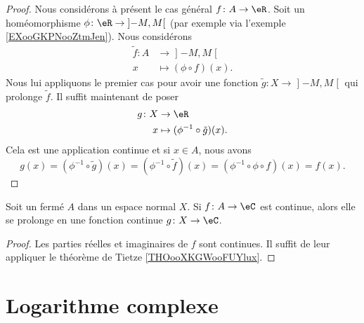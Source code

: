 \begin{proof}
    Nous considérons à présent le cas général \( f\colon A\to \eR\). Soit un homéomorphisme \( \phi\colon \eR\to \mathopen] -M , M \mathclose[\) (par exemple via l'exemple \ref{EXooGKPNooZtmJen}). Nous considérons
    \begin{equation}
        \begin{aligned}
        \tilde f\colon A&\to \mathopen] -M , M \mathclose[ \\
            x&\mapsto (\phi\circ f)(x). 
        \end{aligned}
    \end{equation}
    Nous lui appliquons le premier cas pour avoir une fonction \( \tilde g\colon X\to \mathopen] -M , M \mathclose[\) qui prolonge \( \tilde f\). Il suffit maintenant de poser
    \begin{equation}
        \begin{aligned}
            g\colon X&\to \eR \\
            x&\mapsto (\phi^{-1}\circ\tilde g)(x). 
        \end{aligned}
    \end{equation}
    Cela est une application continue et si \( x\in A\), nous avons
    \begin{equation}
        g(x)=(\phi^{-1}\circ \tilde g)(x)=(\phi^{-1}\circ \tilde f)(x)=(\phi^{-1}\circ\phi\circ f)(x)=f(x).
    \end{equation}
\end{proof}

\begin{corollary}
    Soit un fermé \( A\) dans un espace normal \( X\). Si \( f\colon A\to \eC\) est continue, alors elle se prolonge en une fonction continue \( g\colon X\to \eC\).
\end{corollary}

\begin{proof}
    Les parties réelles et imaginaires de \( f\) sont continues. Il suffit de leur appliquer le théorème de Tietze \ref{THOooXKGWooFUYlux}.
\end{proof}

\section{Logarithme complexe}

